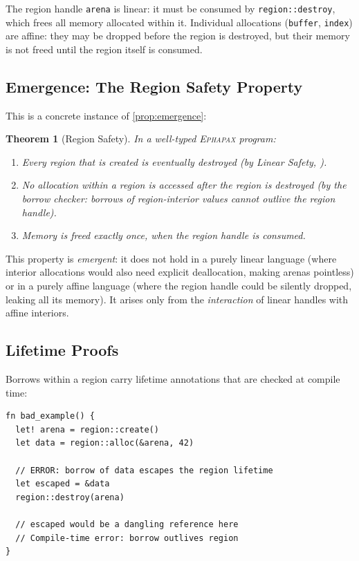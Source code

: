 \documentclass[11pt,a4paper]{article}
\newtheorem{theorem}{Theorem}[section]
\newcommand{\Ephapax}{\textsc{Ephapax}}
\begin{document}
The region handle \lstinline{arena} is linear: it must be consumed by
\lstinline{region::destroy}, which frees all memory allocated within it.
Individual allocations (\lstinline{buffer}, \lstinline{index}) are affine: they
may be dropped before the region is destroyed, but their memory is not freed
until the region itself is consumed.

\subsection{Emergence: The Region Safety Property}

This is a concrete instance of \ref{prop:emergence}:

\begin{theorem}[Region Safety]
\label{thm:region-safety}
In a well-typed \Ephapax{} program:
\begin{enumerate}
  \item Every region that is created is eventually destroyed (by Linear Safety,
    ).
  \item No allocation within a region is accessed after the region is destroyed
    (by the borrow checker: borrows of region-interior values cannot outlive the
    region handle).
  \item Memory is freed exactly once, when the region handle is consumed.
\end{enumerate}
\end{theorem}

This property is \emph{emergent}: it does not hold in a purely linear language
(where interior allocations would also need explicit deallocation, making arenas
pointless) or in a purely affine language (where the region handle could be
silently dropped, leaking all its memory). It arises only from the
\emph{interaction} of linear handles with affine interiors.

\subsection{Lifetime Proofs}

Borrows within a region carry lifetime annotations that are checked at compile
time:

\begin{lstlisting}[language=Ephapax, caption={Lifetime-checked borrows.}]
fn bad_example() {
  let! arena = region::create()
  let data = region::alloc(&arena, 42)

  // ERROR: borrow of data escapes the region lifetime
  let escaped = &data
  region::destroy(arena)

  // escaped would be a dangling reference here
  // Compile-time error: borrow outlives region
}
\end{lstlisting}
\end{document}
